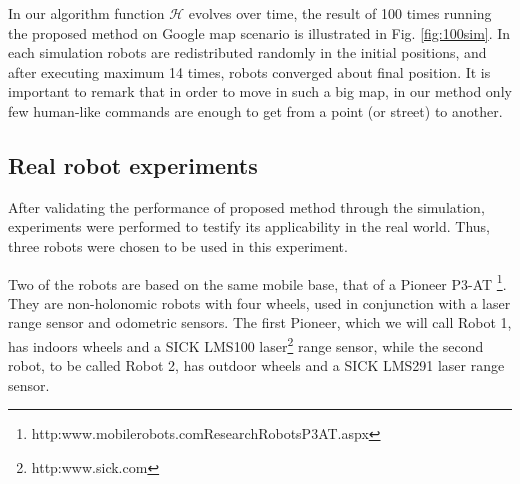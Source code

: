 \documentclass[twocolumn]{svjour3}       %
\begin{document}
In our algorithm function $\mathcal{H}$ evolves over time, the result of 100 times running the proposed method on Google map scenario is illustrated in Fig. \ref{fig:100sim}. In each simulation robots are redistributed randomly in the initial positions, and after executing maximum 14 times, robots converged about final position. It is important to remark that in order to move in such a big map, in our method only few human-like commands are enough to get from a point (or street) to another.


\subsection{Real robot experiments}


After validating the performance of proposed method through the simulation, experiments were performed to testify its applicability in the real world. Thus, three robots were chosen to be used in this experiment.

Two of the robots are based on the same mobile base, that of a Pioneer P3-AT \footnote{http:\/\/www.mobilerobots.com\/ResearchRobots\/P3AT.aspx}. They are non-holonomic robots with four wheels, used in conjunction with a laser range sensor and odometric sensors. The first Pioneer, which we will call Robot 1, has indoors wheels and a SICK LMS100 laser\footnote{http:\/\/www.sick.com} range sensor, while the second robot, to be called Robot 2, has outdoor wheels and a SICK LMS291 laser range sensor. 
\end{document}
